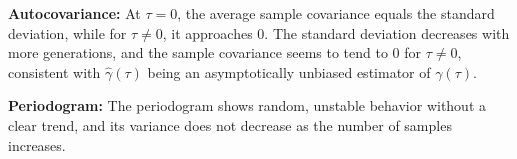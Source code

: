 \documentclass[11pt]{article}
\begin{document}

\begin{solution}
\textbf{Autocovariance:} At $\tau = 0$, the average sample covariance equals the standard deviation, while for $\tau \neq 0$, it approaches 0. The standard deviation decreases with more generations, and the sample covariance seems to tend to 0 for $\tau \neq 0$, consistent with $\hat{\gamma}(\tau)$ being an asymptotically unbiased estimator of $\gamma(\tau)$.

\textbf{Periodogram:} The periodogram shows random, unstable behavior without a clear trend, and its variance does not decrease as the number of samples increases.

    
\end{solution}
\end{document}
